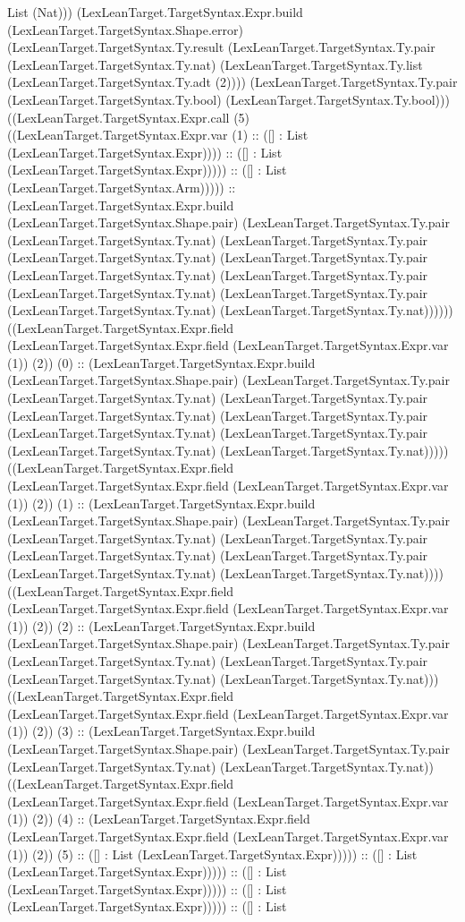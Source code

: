 \documentclass[11pt]{article}
\begin{document}
List (Nat))) (LexLeanTarget.TargetSyntax.Expr.build (LexLeanTarget.TargetSyntax.Shape.error) (LexLeanTarget.TargetSyntax.Ty.result (LexLeanTarget.TargetSyntax.Ty.pair (LexLeanTarget.TargetSyntax.Ty.nat) (LexLeanTarget.TargetSyntax.Ty.list (LexLeanTarget.TargetSyntax.Ty.adt (2)))) (LexLeanTarget.TargetSyntax.Ty.pair (LexLeanTarget.TargetSyntax.Ty.bool) (LexLeanTarget.TargetSyntax.Ty.bool))) ((LexLeanTarget.TargetSyntax.Expr.call (5) ((LexLeanTarget.TargetSyntax.Expr.var (1) :: ([] : List (LexLeanTarget.TargetSyntax.Expr)))) :: ([] : List (LexLeanTarget.TargetSyntax.Expr))))) :: ([] : List (LexLeanTarget.TargetSyntax.Arm))))) :: (LexLeanTarget.TargetSyntax.Expr.build (LexLeanTarget.TargetSyntax.Shape.pair) (LexLeanTarget.TargetSyntax.Ty.pair (LexLeanTarget.TargetSyntax.Ty.nat) (LexLeanTarget.TargetSyntax.Ty.pair (LexLeanTarget.TargetSyntax.Ty.nat) (LexLeanTarget.TargetSyntax.Ty.pair (LexLeanTarget.TargetSyntax.Ty.nat) (LexLeanTarget.TargetSyntax.Ty.pair (LexLeanTarget.TargetSyntax.Ty.nat) (LexLeanTarget.TargetSyntax.Ty.pair (LexLeanTarget.TargetSyntax.Ty.nat) (LexLeanTarget.TargetSyntax.Ty.nat)))))) ((LexLeanTarget.TargetSyntax.Expr.field (LexLeanTarget.TargetSyntax.Expr.field (LexLeanTarget.TargetSyntax.Expr.var (1)) (2)) (0) :: (LexLeanTarget.TargetSyntax.Expr.build (LexLeanTarget.TargetSyntax.Shape.pair) (LexLeanTarget.TargetSyntax.Ty.pair (LexLeanTarget.TargetSyntax.Ty.nat) (LexLeanTarget.TargetSyntax.Ty.pair (LexLeanTarget.TargetSyntax.Ty.nat) (LexLeanTarget.TargetSyntax.Ty.pair (LexLeanTarget.TargetSyntax.Ty.nat) (LexLeanTarget.TargetSyntax.Ty.pair (LexLeanTarget.TargetSyntax.Ty.nat) (LexLeanTarget.TargetSyntax.Ty.nat))))) ((LexLeanTarget.TargetSyntax.Expr.field (LexLeanTarget.TargetSyntax.Expr.field (LexLeanTarget.TargetSyntax.Expr.var (1)) (2)) (1) :: (LexLeanTarget.TargetSyntax.Expr.build (LexLeanTarget.TargetSyntax.Shape.pair) (LexLeanTarget.TargetSyntax.Ty.pair (LexLeanTarget.TargetSyntax.Ty.nat) (LexLeanTarget.TargetSyntax.Ty.pair (LexLeanTarget.TargetSyntax.Ty.nat) (LexLeanTarget.TargetSyntax.Ty.pair (LexLeanTarget.TargetSyntax.Ty.nat) (LexLeanTarget.TargetSyntax.Ty.nat)))) ((LexLeanTarget.TargetSyntax.Expr.field (LexLeanTarget.TargetSyntax.Expr.field (LexLeanTarget.TargetSyntax.Expr.var (1)) (2)) (2) :: (LexLeanTarget.TargetSyntax.Expr.build (LexLeanTarget.TargetSyntax.Shape.pair) (LexLeanTarget.TargetSyntax.Ty.pair (LexLeanTarget.TargetSyntax.Ty.nat) (LexLeanTarget.TargetSyntax.Ty.pair (LexLeanTarget.TargetSyntax.Ty.nat) (LexLeanTarget.TargetSyntax.Ty.nat))) ((LexLeanTarget.TargetSyntax.Expr.field (LexLeanTarget.TargetSyntax.Expr.field (LexLeanTarget.TargetSyntax.Expr.var (1)) (2)) (3) :: (LexLeanTarget.TargetSyntax.Expr.build (LexLeanTarget.TargetSyntax.Shape.pair) (LexLeanTarget.TargetSyntax.Ty.pair (LexLeanTarget.TargetSyntax.Ty.nat) (LexLeanTarget.TargetSyntax.Ty.nat)) ((LexLeanTarget.TargetSyntax.Expr.field (LexLeanTarget.TargetSyntax.Expr.field (LexLeanTarget.TargetSyntax.Expr.var (1)) (2)) (4) :: (LexLeanTarget.TargetSyntax.Expr.field (LexLeanTarget.TargetSyntax.Expr.field (LexLeanTarget.TargetSyntax.Expr.var (1)) (2)) (5) :: ([] : List (LexLeanTarget.TargetSyntax.Expr))))) :: ([] : List (LexLeanTarget.TargetSyntax.Expr))))) :: ([] : List (LexLeanTarget.TargetSyntax.Expr))))) :: ([] : List (LexLeanTarget.TargetSyntax.Expr))))) :: ([] : List 
\end{document}
